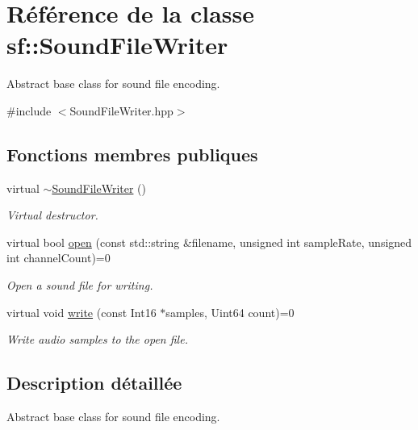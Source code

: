 \hypertarget{classsf_1_1SoundFileWriter}{}\section{Référence de la classe sf\+:\+:Sound\+File\+Writer}
\label{classsf_1_1SoundFileWriter}


Abstract base class for sound file encoding.  




{\ttfamily \#include $<$Sound\+File\+Writer.\+hpp$>$}

\subsection*{Fonctions membres publiques}
\begin{DoxyCompactItemize}
\item 
\mbox{\label{classsf_1_1SoundFileWriter_a76944fc158688f35050bd5b592c90270}} 
virtual \hyperlink{classsf_1_1SoundFileWriter_a76944fc158688f35050bd5b592c90270}{$\sim$\+Sound\+File\+Writer} ()
\begin{DoxyCompactList}\small\item\em Virtual destructor. \end{DoxyCompactList}\item 
virtual bool \hyperlink{classsf_1_1SoundFileWriter_a5c92bcaaa880ef4d3eaab18dae1d3d07}{open} (const std\+::string \&filename, unsigned int sample\+Rate, unsigned int channel\+Count)=0
\begin{DoxyCompactList}\small\item\em Open a sound file for writing. \end{DoxyCompactList}\item 
virtual void \hyperlink{classsf_1_1SoundFileWriter_a4ce597e7682d22c5b2c98d77e931a1da}{write} (const Int16 $\ast$samples, Uint64 count)=0
\begin{DoxyCompactList}\small\item\em Write audio samples to the open file. \end{DoxyCompactList}\end{DoxyCompactItemize}


\subsection{Description détaillée}
Abstract base class for sound file encoding. 


